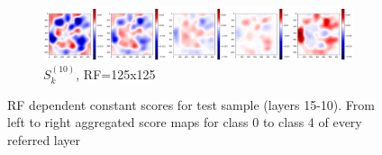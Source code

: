 \documentclass[preprint]{elsarticle}
\theoremstyle{definition} %
\theoremstyle{remark}
\begin{document}
\begin{figure}[h!]
	\begin{subfigure}[b]{\textwidth}
		\includegraphics[width=\textwidth]{figures/score-prop-23713_left/score_k125.png}
		\caption{$S_k^{(10)}$, RF=125x125}
		\label{fig:score_k125}
	\end{subfigure}

	\caption{RF dependent constant scores for test sample (layers 15-10). From left to right aggregated score maps for class 0 to class 4 of every referred layer}
	\label{fig:test1_score_explanation_k}
\end{figure}
\end{document}

